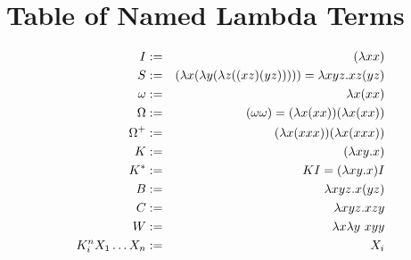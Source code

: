 \chapter{Table of Named Lambda Terms}
{
  \def\bcr{\cline{1-3}}
  \begin{eqnarray*}
    I &:=& (\lambda xx)\\
    S &:=& (\lambda x(\lambda y(\lambda z((xz)(yz))))) = \lambda xyz.xz(yz)\\
    \omega &:=& \lambda x(xx)\\
    \Omega &:=& (\omega \omega) = (\lambda x(xx))(\lambda x(xx))\\
    \Omega^+ &:=& (\lambda x(xxx))(\lambda x(xxx))\\
    K &:=& (\lambda xy.x)\\
    K^* &:=& KI = (\lambda xy.x)I\\
    B &:=& \lambda xyz . x(yz)\\
    C &:=& \lambda xyz . xzy\\
    W &:=& \lambda x \lambda y\ xyy\\
    K_i^nX_1\ldots X_n &:=& X_i
  \end{eqnarray*}
}